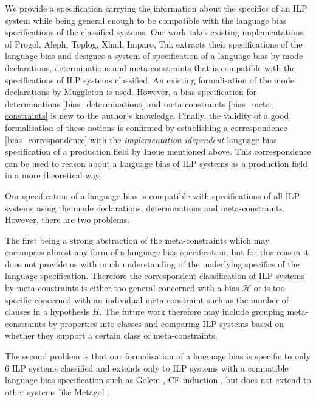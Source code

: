 We provide a specification carrying the information about the specifics of an ILP system while being general enough to be compatible with the language bias specifications of the classified systems.
Our work takes existing implementations of Progol, Aleph, Toplog, Xhail, Imparo, Tal; extracts their specifications of the language bias and designes a system of specification of a language bias by mode declarations, determinations and meta-constraints that is compatible with the specifications of ILP systems classified. An existing formalisation of the mode declarations by Muggleton \cite{muggleton1995inverse} is used. However, a bias specification for determinations \ref{bias_determinations} and meta-constraints \ref{bias_meta-constraints} is new to the author's knowledge. Finally, the validity of a good formalisation of these notions is confirmed by establishing a correspondence \ref{bias_correspondence} with the \emph{implementation idependent} language bias specification of a production field by Inoue \cite{inoue1992linear} mentioned above. This correspondence can be used to reason about a language bias of ILP systems as a production field in a more theoretical way.

Our specification of a language bias is compatible with specifications of all ILP systems using the mode declarations, determinations and meta-constraints. However, there are two problems.

The first being a strong abstraction of the meta-constraints which may encompass almost any form of a language bias specification, but for this reason it does not provide us with much understanding of the underlying specifics of the language specification. Therefore the correspondent classification of ILP systems by meta-constraints is either too general concerned with a bias $\mathcal{H}$ or is too specific concerned with an individual meta-constraint such as the number of clauses in a hypothesis $H$. The future work therefore may include grouping meta-constraints by properties into classes and comparing ILP systems based on whether they support a certain class of meta-constraints.

The second problem is that our formalisation of a language bias is specific to only 6 ILP systems classified and extends only to ILP systems with a compatible language bias specification such as Golem \cite{muggleton1992efficient}, CF-induction \cite{yamamoto2014cfInductionWebsite}, but does not extend to other systems like Metagol \cite{muggleton2013meta}\cite{muggleton2014meta}.

